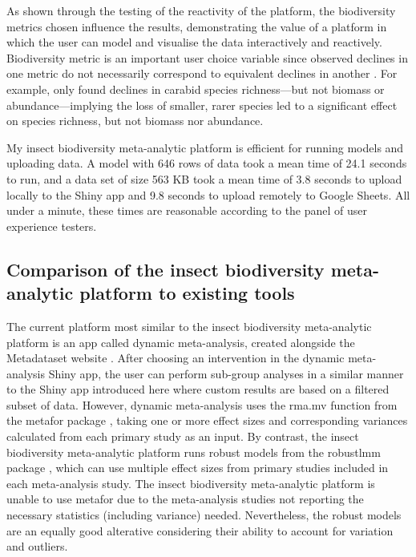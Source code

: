 \documentclass[11pt]{article}
\begin{document}
		\noindent As shown through the testing of the reactivity of the platform, the biodiversity metrics chosen influence the results, demonstrating the value of a platform in which the user can model and visualise the data interactively and reactively. Biodiversity metric is an important user choice variable since observed declines in one metric do not necessarily correspond to equivalent declines in another \citep{hillebrand2018biodiversity}. For example, \citet{homburg2019have} only found declines in carabid species richness—but not biomass or abundance—implying the loss of smaller, rarer species led to a significant effect on species richness, but not biomass nor abundance. 
		
		\noindent My insect biodiversity meta-analytic platform is efficient for running models and uploading data. A model with 646 rows of data took a mean time of 24.1 seconds to run, and a data set of size 563 KB took a mean time of 3.8 seconds to upload locally to the Shiny app and 9.8 seconds to upload remotely to Google Sheets. All under a minute, these times are reasonable according to the panel of user experience testers.
		
		\subsection{Comparison of the insect biodiversity meta-analytic platform to existing tools}
		The current platform most similar to the insect biodiversity meta-analytic platform is an app called dynamic meta-analysis, created alongside the Metadataset website \citep{shackelford2021dynamic}. After choosing an intervention in the dynamic meta-analysis Shiny app, the user can perform sub-group analyses in a similar manner to the Shiny app introduced here where custom results are based on a filtered subset of data. However, dynamic meta-analysis uses the rma.mv function from the metafor package \citep{viechtbauer2010conducting}, taking one or more effect sizes and corresponding variances calculated from each primary study as an input. By contrast, the insect biodiversity meta-analytic platform runs robust models from the robustlmm package \citep{koller2016robustlmm}, which can use multiple effect sizes from primary studies included in each meta-analysis study. The insect biodiversity meta-analytic platform is unable to use metafor due to the meta-analysis studies not reporting the necessary statistics (including variance) needed. Nevertheless, the robust models are an equally good alterative considering their ability to account for variation and outliers. 
		
\end{document}
